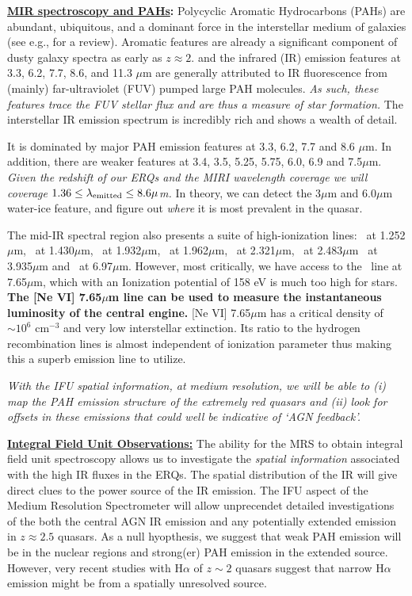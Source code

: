 \smallskip
\smallskip
\noindent
{\bf \underline{MIR spectroscopy and PAHs}:}
Polycyclic Aromatic Hydrocarbons (PAHs) are abundant, ubiquitous, and
a dominant force in the interstellar medium of galaxies (see e.g., for
a review).  Aromatic features are already a significant component of
dusty galaxy spectra as early as $z\approx2$.  and the infrared (IR)
emission features at 3.3, 6.2, 7.7, 8.6, and 11.3 $\mu$m are generally
attributed to IR fluorescence from (mainly) far-ultraviolet (FUV)
pumped large PAH molecules. {\it As such, these features trace the FUV
stellar flux and are thus a measure of star formation.} The
interstellar IR emission spectrum is incredibly rich and shows a
wealth of detail. {It is dominated by major PAH emission features at
3.3, 6.2, 7.7 and 8.6 $\mu$m.  In addition, there are weaker features
at 3.4, 3.5, 5.25, 5.75, 6.0, 6.9 and 7.5$\mu$m. {\it Given the
redshift of our ERQs and the MIRI wavelength coverage we will coverage
$1.36 \leq \lambda_{\rm emitted} \leq 8.6 \mu$m.}  In theory, we can
detect the 3$\mu$m and 6.0$\mu$m water-ice feature, and figure out
{\it where} it is most prevalent in the quasar.

\smallskip
\smallskip
\noindent
The mid-IR spectral region also presents a suite of high-ionization
lines: \snine\ at 1.252$\mu$m, \six\ at 1.430$\mu$m, \sixi\ at
1.932$\mu$m, \sivi\ at 1.962$\mu$m, \caviii\ at 2.321$\mu$m, \sivi\ at
2.483$\mu$m \siix\ at 3.935$\mu$m and \arii\ at 6.97$\mu$m.  However,
most critically, we have access to the \nevi\ line at 7.65$\mu$m,
which with an Ionization potential of 158 eV is much too high for
stars.  {\bf The [Ne VI] 7.65$\mu$m line can be used to measure the
instantaneous luminosity of the central engine.}  [Ne VI] 7.65$\mu$m
has a critical density of $\sim10^{6}$ cm$^{-3}$ and very low
interstellar extinction.  Its ratio to the hydrogen recombination
lines is almost independent of ionization parameter thus making this a
superb emission line to utilize.

\smallskip
\smallskip
\noindent
{\it With the IFU spatial information, at medium resolution, we will be able to 
(i) map the PAH emission structure of the extremely red quasars and (ii) look 
for offsets in these emissions that could well be indicative of `AGN feedback'.}

\smallskip
\smallskip
\noindent
{\bf \underline{Integral Field Unit Observations:}} 
The ability for the MRS to obtain integral field unit spectroscopy
allows us to investigate the {\it spatial information} associated with
the high IR fluxes in the ERQs. The spatial distribution of the IR
will give direct clues to the power source of the IR emission.  The
IFU aspect of the Medium Resolution Spectrometer will allow
unprecendet detailed investigations of the both the central AGN IR
emission and any potentially extended emission in $z\approx2.5$
quasars.  As a null hyopthesis, we suggest that weak PAH emission will
be in the nuclear regions and strong(er) PAH emission in the extended
source. However, very recent studies with H$\alpha$ of $z\sim2$
quasars suggest that narrow H$\alpha$ emission might be from a
spatially unresolved source.

}
